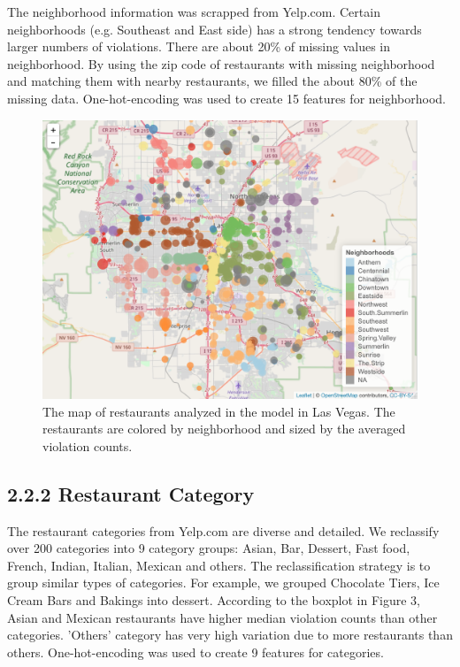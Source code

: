 \documentclass[letterpaper, 11 pt, conference]{ieeeconf}
\begin{document}
The neighborhood information was scrapped from Yelp.com. Certain neighborhoods (e.g. Southeast and East side) has a strong tendency towards larger numbers of violations. There are about 20\% of missing values in neighborhood. By using the zip code of restaurants with missing neighborhood and matching them with nearby restaurants, we filled the about 80\% of the missing data. One-hot-encoding was used to create 15 features for neighborhood.

\begin{figure}[h]
	\centering
    \includegraphics[scale = 0.28]{map_vio}
    \caption{The map of restaurants analyzed in the model in Las Vegas. The restaurants are colored by neighborhood and sized by the averaged violation counts.}
\end{figure}

\subsection*{2.2.2 Restaurant Category}

The restaurant categories from Yelp.com are diverse and detailed. We reclassify over 200 categories into 9 category groups: Asian, Bar, Dessert, Fast food, French, Indian, Italian, Mexican and others. The reclassification strategy is to group similar types of categories. For example, we grouped Chocolate Tiers, Ice Cream Bars and Bakings into dessert. According to the boxplot in Figure 3, Asian and Mexican restaurants have higher median violation counts than other categories. 'Others' category has very high variation due to more restaurants than others. One-hot-encoding was used to create 9 features for categories.
\end{document}
